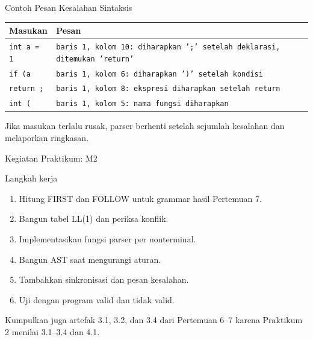\documentclass[aspectratio=169,10pt,t]{beamer}
\begin{document}
\begin{frame}{Contoh Pesan Kesalahan Sintaksis}
  \scriptsize
  \setlength{\tabcolsep}{4pt}
  \begin{tabular}{@{}p{3.0cm}p{10.4cm}@{}}
    \toprule
    \textbf{Masukan} & \textbf{Pesan} \\
    \midrule
    \texttt{int a = 1} &
      \texttt{baris 1, kolom 10: diharapkan ';' setelah deklarasi,
      ditemukan 'return'} \\
    \texttt{if (a} &
      \texttt{baris 1, kolom 6: diharapkan ')' setelah kondisi} \\
    \texttt{return ;} &
      \texttt{baris 1, kolom 8: ekspresi diharapkan setelah return} \\
    \texttt{int (} &
      \texttt{baris 1, kolom 5: nama fungsi diharapkan} \\
    \bottomrule
  \end{tabular}

  \vspace{4pt}
  {\scriptsize\color{ubbblue!75}Jika masukan terlalu rusak, parser
  berhenti setelah sejumlah kesalahan dan melaporkan ringkasan.}
\end{frame}

\begin{frame}{Kegiatan Praktikum: M2}
  \begin{block}{Langkah kerja}
    \footnotesize
    \begin{enumerate}
      \setlength{\itemsep}{1pt}
      \item Hitung FIRST dan FOLLOW untuk grammar hasil Pertemuan 7.
      \item Bangun tabel LL(1) dan periksa konflik.
      \item Implementasikan fungsi parser per nonterminal.
      \item Bangun AST saat mengurangi aturan.
      \item Tambahkan sinkronisasi dan pesan kesalahan.
      \item Uji dengan program valid dan tidak valid.
    \end{enumerate}
  \end{block}

  \vspace{2pt}
  {\footnotesize\color{ubbblue!80}Kumpulkan juga artefak 3.1, 3.2, dan
  3.4 dari Pertemuan 6--7 karena Praktikum 2 menilai 3.1--3.4 dan
  4.1.}
\end{frame}
\end{document}
